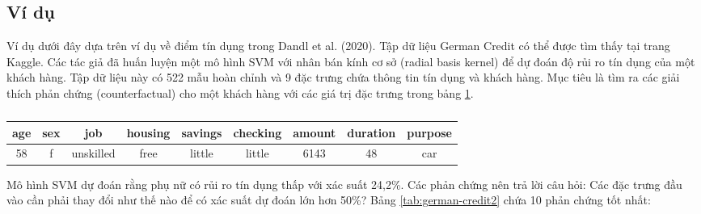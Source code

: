 \subsection{Ví dụ}

Ví dụ dưới đây dựa trên ví dụ về điểm tín dụng trong Dandl et al. (2020). Tập dữ liệu German Credit có thể được tìm thấy tại trang Kaggle. Các tác giả đã huấn luyện một mô hình SVM với nhân bán kính cơ sở (radial basis kernel) để dự đoán độ rủi ro tín dụng của một khách hàng. Tập dữ liệu này có 522 mẫu hoàn chỉnh và 9 đặc trưng chứa thông tin tín dụng và khách hàng. Mục tiêu là tìm ra các giải thích phản chứng (counterfactual) cho một khách hàng với các giá trị đặc trưng trong bảng \ref{tab:german-credit}.

\begin{table}[]
\caption{}
\centering
\label{tab:german-credit}
\begin{tabular}{|c|c|c|c|c|c|c|c|c|}
\hline
age & sex & job       & housing & savings & checking & amount & duration & purpose \\ \hline
58  & f   & unskilled & free    & little  & little   & 6143   & 48       & car     \\ \hline
\end{tabular}
\end{table}

Mô hình SVM dự đoán rằng phụ nữ có rủi ro tín dụng thấp với xác suất 24,2\%. Các phản chứng nên trả lời câu hỏi: Các đặc trưng đầu vào cần phải thay đổi như thế nào để có xác suất dự đoán lớn hơn 50\%? Bảng \ref{tab:german-credit2} chứa 10 phản chứng tốt nhất:

